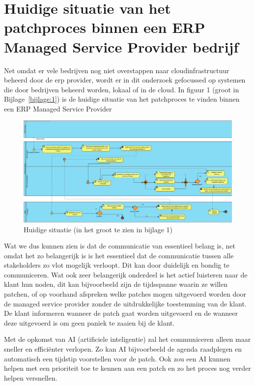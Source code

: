 \section{Huidige situatie van het patchproces binnen een ERP Managed Service Provider bedrijf}

Net omdat er vele bedrijven nog niet overstappen naar cloudinfrastructuur beheerd door de erp provider, wordt er in dit onderzoek gefocussed op systemen die door bedrijven beheerd worden, lokaal of in de cloud. In figuur 1 (groot in Bijlage~\ref{bijlage:1}) is de huidige situatie van het patchproces te vinden binnen een ERP Managed Service Provider \\

\begin{figure}[htbp]
    \centering
    \includegraphics[width=\textwidth]{huidigesituatie.jpg}
    \caption{Huidige situatie (in het groot te zien in bijlage 1)}
    \label{fig:huidigesituatie}
\end{figure}

Wat we dus kunnen zien is dat de communicatie van essentieel belang is, net omdat het zo belangerijk is is het essentieel dat de communicatie tussen alle stakeholders zo vlot mogelijk verloopt. Dit kan door duidelijk en bondig te communiceren. Wat ook zeer belangerijk onderdeel is het actief luisteren naar de klant hun noden, dit kan bijvoorbeeld zijn de tijdsspanne waarin ze willen patchen, of op voorhand afspreken
 welke patches mogen uitgevoerd worden door de managed service provider zonder de uitdrukkelijke toestemming van de klant. De klant informeren wanneer de patch gaat worden uitgevoerd en de wanneer deze uitgevoerd is om geen paniek te zaaien bij de klant. 

Met de opkomst van AI (artificiele inteligentie) zal het communiceren alleen maar sneller en efficiënter verlopen. Zo kan AI bijvoorbeeld de agenda raadplegen en automatisch een tijdstip voorstellen voor de patch. Ook zou een AI kunnen helpen met een prioriteit toe te kennen aan een patch en zo het proces nog verder helpen versnellen. \\





